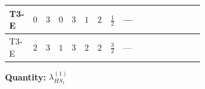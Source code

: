 \documentclass[8pt]{article}
\begin{document}
\begin{landscape}
\begin{longtable}{@{}llcccccc >{\raggedright\arraybackslash}p{0.21\linewidth} >{\raggedright\arraybackslash}p{0.21\linewidth} >{\raggedright\arraybackslash}p{0.21\linewidth}@{}}
\midrule
T3-E & $0$ & $3$ & $0$ & $3$ & $1$ & $2$ & $\frac{1}{2}$ & --- & \scriptsize\adjustbox{max width=\linewidth}{$\begin{gathered} -2 \operatorname{Tr}\!\left({y_1}\,\left({y_1}\right)^{\dagger}\,{Y_e}\,\left({Y_e}\right)^{\dagger}\right)\end{gathered}$} & \scriptsize\adjustbox{max width=\linewidth}{$\begin{gathered} +4 {\lambda_5} \left({\lambda_5}\right)^{*}\end{gathered}$} \\
\midrule
T3-E & $2$ & $3$ & $1$ & $3$ & $2$ & $2$ & $\frac{3}{2}$ & --- & \scriptsize\adjustbox{max width=\linewidth}{$\begin{gathered} -2 \operatorname{Tr}\!\left({y_1}\,\left({y_1}\right)^{\dagger}\,{Y_e}\,\left({Y_e}\right)^{\dagger}\right)\end{gathered}$} & \scriptsize\adjustbox{max width=\linewidth}{$\begin{gathered} +4 {\lambda_5} \left({\lambda_5}\right)^{*}\end{gathered}$} \\
\midrule
\bottomrule
\end{longtable}
\clearpage
\noindent\textbf{Quantity: }$\lambda_{HS_1}^{(1)}$\par\smallskip

\end{landscape}
\end{document}
